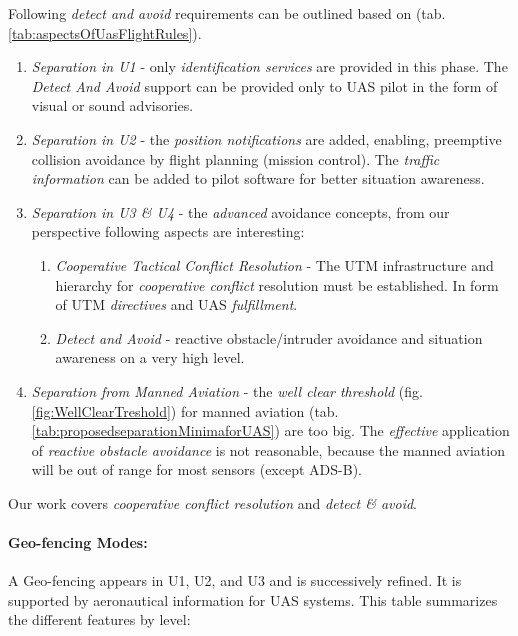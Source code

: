 \noindent Following \emph{detect and avoid} requirements can be outlined based on (tab. \ref{tab:aspectsOfUasFlightRules}).
\begin{enumerate}
    \item \emph{Separation in U1} - only \emph{identification services} are provided in this phase. The \emph{Detect And Avoid} support can be provided only to UAS pilot in the form of visual or sound advisories. 
    
    \item \emph{Separation in U2} - the \emph{position notifications} are added, enabling, preemptive collision avoidance by flight planning (mission control). The \emph{traffic information} can be added to pilot software for better situation awareness.  


    \item \emph{Separation in U3 \& U4} - the \emph{advanced} avoidance concepts, from our perspective following aspects are interesting: 
    \begin{enumerate}[a]
        \item \emph{Cooperative Tactical Conflict Resolution} - The UTM infrastructure and hierarchy for \emph{cooperative conflict} resolution must be established. In form of UTM \emph{directives} and UAS \emph{fulfillment}.
        
        \item \emph{Detect and Avoid} - reactive obstacle/intruder avoidance and situation awareness on a very high level.
    \end{enumerate}
    
    \item \emph{Separation from Manned Aviation} - the \emph{well clear threshold} (fig. \ref{fig:WellClearTreshold}) for manned aviation  (tab.\ref{tab:proposedseparationMinimaforUAS}) are too big. The \emph{effective} application of \emph{reactive obstacle avoidance} is not reasonable, because the manned aviation will be out of range for most sensors (except ADS-B).
\end{enumerate}

\begin{note}
    Our work covers \emph{cooperative conflict resolution} and \emph{detect \& avoid}.
\end{note}
\newpage
\paragraph{Geo-fencing Modes:} A Geo-fencing appears in U1, U2, and U3 and is successively refined. It is supported by aeronautical information for UAS systems. This table summarizes the different features by level:

